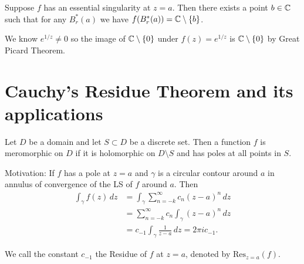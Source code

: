 \documentclass[10pt, a4paper]{article}
\begin{document}
\begin{theorem}
    Suppose $f$ has an essential singularity at $z = a$.
    Then there exists a point $b \in \mathbb{C}$ such that for any $B_{r}^{*}(a)$ we have $f(B_{r}^{*}(a)) = \mathbb{C} \setminus \{b\}$.
\end{theorem}

\begin{example}
    We know $e ^ {1 / z} \neq 0$ so the image of $\mathbb{C} \setminus \{0\}$ under $f(z) = e ^ {1 / z}$ is $\mathbb{C} \setminus \{0\}$ by Great Picard Theorem.
\end{example}

\newpage

\section{Cauchy's Residue Theorem and its applications}

\begin{definition}[Meromorphic]
    Let $D$ be a domain and let $S \subset D$ be a discrete set.
    Then a function $f$ is meromorphic on $D$ if it is holomorphic on $D \setminus S$ and has poles at all points in $S$.
\end{definition}

Motivation:
If $f$ has a pole at $z = a$ and $\gamma$ is a circular contour around $a$ in annulus of convergence of the LS of $f$ around $a$.
Then
\begin{align*}
    \int_{\gamma}f(z)\,dz &= \int_{\gamma}\sum_{n = -k}^{\infty}c_n(z - a) ^ n\,dz \\
    &= \sum_{n = -k}^{\infty}c_n\int_{\gamma}(z - a) ^ n\,dz \\
    &= c_{-1}\int_{\gamma}\frac{1}{z - a}\,dz = 2\pi ic_{-1}.
\end{align*}

\begin{definition}[Residue]
    We call the constant $c_{-1}$ the Residue of $f$ at $z = a$,
    denoted by $\mathrm{Res}_{z = a}(f)$.
\end{definition}
\end{document}
